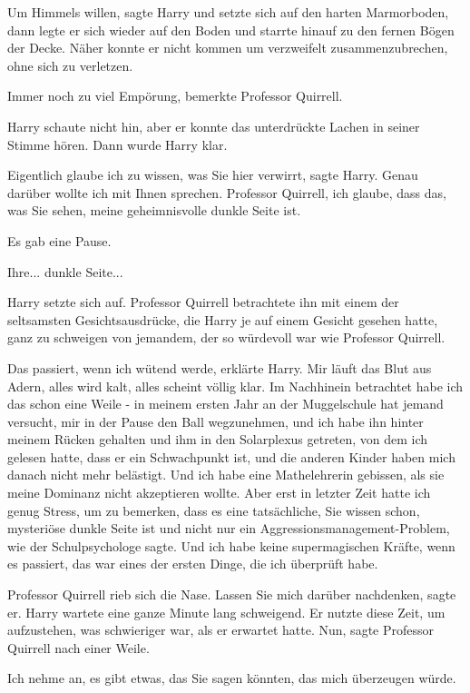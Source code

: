 \glqq{}Um Himmels willen\grqq{}, sagte Harry und setzte sich auf den harten
Marmorboden, dann legte er sich wieder auf den Boden und starrte hinauf zu den
fernen Bögen der Decke. Näher konnte er nicht kommen um verzweifelt
zusammenzubrechen, ohne sich zu verletzen.

\glqq{}Immer noch zu viel Empörung\grqq{}, bemerkte Professor Quirrell.

Harry schaute nicht hin, aber er konnte das unterdrückte Lachen in seiner Stimme
hören. Dann wurde Harry klar.

\glqq{}Eigentlich glaube ich zu wissen, was Sie hier verwirrt\grqq{}, sagte
Harry. \glqq{}Genau darüber wollte ich mit Ihnen sprechen. Professor Quirrell,
ich glaube, dass das, was Sie sehen, meine geheimnisvolle dunkle Seite
ist.\grqq{}

Es gab eine Pause.

\glqq{}Ihre... dunkle Seite...\grqq{}

Harry setzte sich auf. Professor Quirrell betrachtete ihn mit einem der
seltsamsten Gesichtsausdrücke, die Harry je auf einem Gesicht gesehen hatte,
ganz zu schweigen von jemandem, der so würdevoll war wie Professor Quirrell.

\glqq{}Das passiert, wenn ich wütend werde\grqq{}, erklärte Harry. \glqq{}Mir
läuft das Blut aus Adern, alles wird kalt, alles scheint völlig klar. Im
Nachhinein betrachtet habe ich das schon eine Weile - in meinem ersten Jahr an
der Muggelschule hat jemand versucht, mir in der Pause den Ball wegzunehmen, und
ich habe ihn hinter meinem Rücken gehalten und ihm in den Solarplexus getreten,
von dem ich gelesen hatte, dass er ein Schwachpunkt ist, und die anderen Kinder
haben mich danach nicht mehr belästigt. Und ich habe eine Mathelehrerin
gebissen, als sie meine Dominanz nicht akzeptieren wollte. Aber erst in letzter
Zeit hatte ich genug Stress, um zu bemerken, dass es eine tatsächliche, Sie
wissen schon, mysteriöse dunkle Seite ist und nicht nur ein
Aggressionsmanagement-Problem, wie der Schulpsychologe sagte. Und ich habe keine
supermagischen Kräfte, wenn es passiert, das war eines der ersten Dinge, die ich
überprüft habe.\grqq{}

Professor Quirrell rieb sich die Nase. \glqq{}Lassen Sie mich darüber
nachdenken\grqq{}, sagte er. Harry wartete eine ganze Minute lang schweigend. Er
nutzte diese Zeit, um aufzustehen, was schwieriger war, als er erwartet hatte.
\glqq{}Nun\grqq{}, sagte Professor Quirrell nach einer Weile.

\glqq{}Ich nehme an, es gibt etwas, das Sie sagen könnten, das mich überzeugen
würde.\grqq{}

